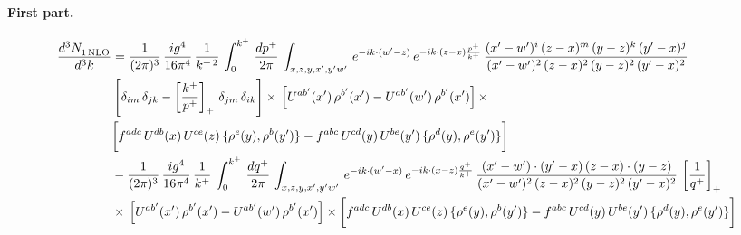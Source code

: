 \documentclass[10pt]{article}
\numberwithin{equation}{section}
\begin{document}
\paragraph{First part.}
\begin{align}
     \frac{d^{3}N_{1\,\rm NLO}^{\rm}}{d^{3}k}  & =  \frac{1}{(2\pi)^{3}}\, \frac{ig^{4}}{16\pi^{4}}\, \frac{1}{k^{+\,2}}\,\int_{0}^{k^{+}}\, \frac{dp^{+}}{2\pi}\,\int_{x,z,y,x',y'w'}\,e^{-ik\cdot (w^\prime-z)}\,e^{-ik\cdot (z-x)\frac{p^{+}}{k^{+}}}\,\frac{(x'-w')^{i}\,(z-x)^{m}\,(y-z)^{k}\,(y'-x)^{j}}{(x'-w')^{2}\,(z-x)^{2}\,(y-z)^{2}\,(y'-x)^{2}}\,\notag \\ & \left[\delta_{im}\,\delta_{jk}-\left[\frac{k^{+}}{p^{+}}\right]_{+}\, \delta_{jm}\,\delta_{ik}\right]\times\, \left[U^{ab'}(x')\,\rho^{b'}(x')-U^{ab'}(w')\,\rho^{b'}(x')\right]\times\notag \\ & \bigg[f^{adc}\,U^{db}(x)\,U^{ce}(z)\, \{\rho^{e}(y),\rho^{b}(y')\}-f^{abc}\,U^{cd}(y)\,U^{be}(y')\, \{\rho^{d}(y),\rho^{e}(y')\}\bigg] \notag \\ & -\frac{1}{(2\pi)^{3}}\, \frac{ig^{4}}{16\pi^{4}}\, \frac{1}{k^{+}}\,\int_{0}^{k^{+}}\, \frac{dq^{+}}{2\pi}\,\int_{x,z,y,x',y'w'}\,e^{-ik\cdot (w^\prime-x)}\,e^{-ik\cdot (x-z)\frac{q^{+}}{k^{+}}}\,\frac{(x'-w')\cdot (y'-x)\,(z-x)\cdot (y-z)}{(x'-w')^{2}\,(z-x)^{2}\,(y-z)^{2}\,(y'-x)^{2}}\,\left[\frac{1}{q^{+}}\right]_{+}\notag \\ & \times\, \left[U^{ab'}(x')\,\rho^{b'}(x')-U^{ab'}(w')\,\rho^{b'}(x')\right]\times \bigg[f^{adc}\,U^{db}(x)\,U^{ce}(z)\, \{\rho^{e}(y),\rho^{b}(y')\}-f^{abc}\,U^{cd}(y)\,U^{be}(y')\, \{\rho^{d}(y),\rho^{e}(y')\}\bigg]
\end{align}
\end{document}
